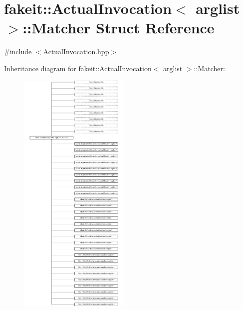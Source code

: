 \hypertarget{structfakeit_1_1ActualInvocation_1_1Matcher}{}\section{fakeit\+::Actual\+Invocation$<$ arglist $>$\+::Matcher Struct Reference}
\label{structfakeit_1_1ActualInvocation_1_1Matcher}


{\ttfamily \#include $<$Actual\+Invocation.\+hpp$>$}

Inheritance diagram for fakeit\+::Actual\+Invocation$<$ arglist $>$\+::Matcher\+:\begin{figure}[H]
\begin{center}
\leavevmode
\includegraphics[height=12.000000cm]{structfakeit_1_1ActualInvocation_1_1Matcher}
\end{center}
\end{figure}
